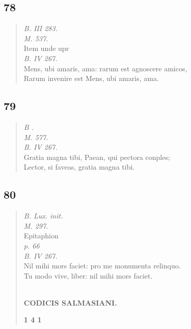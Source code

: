 \documentclass[11pt, a4paper]{report}
\begin{document}
            \subsection*{78}
      \begin{verse}
      \textit{B. III 283.} \\ \textit{M. 537.} \\ Item unde upr \\ \textit{B. IV 267.} \\ Mens, ubi amaris, ama: rarum est agnoscere amicos, \\ Rarum invenire  \lbrack est \rbrack  Mens, ubi amaris, ama. \\ 
      \end{verse}
  
            \subsection*{79}
      \begin{verse}
      \textit{B .} \\ \textit{M. 577.} \\ \textit{B. IV 267.} \\ Gratia magna tibi, Paean, qui pectora conples; \\ Lector, si faveas, gratia magna tibi. \\ 
      \end{verse}
  
            \subsection*{80}
      \begin{verse}
      \textit{B. Lux. init.} \\ \textit{M. 297.} \\ Epitaphion \\ \textit{p. 66} \\ \textit{B. IV 267.} \\ Nil mihi mors faciet: pro me monumenta relinquo. \\ Tu modo vive, liber: nil mihi mors faciet. \\ 
        ﻿\pagebreak 
    \begin{center} \textbf{CODICIS SALMASIANI.} \end{center}\begin{center} \textbf{1 4 1} \end{center}
      \end{verse}
  
\end{document}
